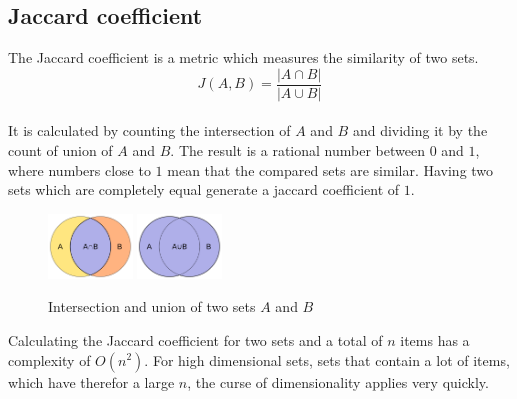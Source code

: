 \subsection{Jaccard coefficient}

The Jaccard coefficient is a metric which measures the similarity of two sets.\\

\begin{equation}
    J(A,B) = \frac{ | A \cap B | }{ | A \cup B | }
\end{equation}\\

It is calculated by counting the intersection of $ A $ and $ B $ and dividing it by the count of union of $ A $ and $ B $. The result is a rational number between $ 0 $ and $ 1 $, where numbers close to $ 1 $ mean that the compared sets are similar. Having two sets which are completely equal generate a jaccard coefficient of $ 1 $.\\

\begin{figure}[H]
    \centering
    \includegraphics[width=0.20\textwidth]{images/Intersection_of_sets_A_and_B.png} 
    \includegraphics[width=0.20\textwidth]{images/Union_of_sets_A_and_B.png}
    \caption{Intersection and union of two sets $ A $ and $ B $ \cite{intersectionImage,unionImage}}
\end{figure}

Calculating the Jaccard coefficient for two sets and a total of $ n $ items has a complexity of $ O(n^2) $. For high dimensional sets, sets that contain a lot of items, which have therefor a large $ n $, the curse of dimensionality applies very quickly.\\